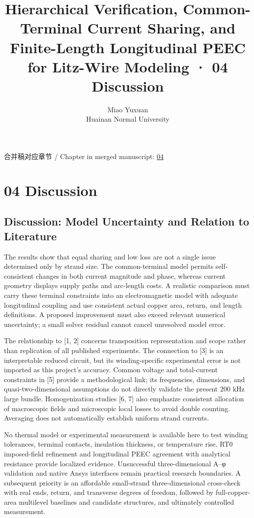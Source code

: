 \documentclass[11pt]{article}
\begin{document}
\title{Hierarchical Verification, Common-Terminal Current Sharing, and Finite-Length Longitudinal PEEC for Litz-Wire Modeling · 04 Discussion}
\author{Miao Yuxuan\\Huainan Normal University}
\date{}
\maketitle
\noindent 合并稿对应章节 / Chapter in merged manuscript: \href{paper_en_single.pdf#chapter-04}{04}\par
\FloatBarrier
\section*{04 Discussion}
\hypertarget{chapter-04}{}
\subsection*{Discussion: Model Uncertainty and Relation to Literature}
\hypertarget{04.discussion.heading}{}
The results show that equal sharing and low loss are not a single issue determined only by strand size. The common-terminal model permits self-consistent changes in both current magnitude and phase, whereas current geometry displays supply paths and arc-length costs. A realistic comparison must carry these terminal constraints into an electromagnetic model with adequate longitudinal coupling and use consistent actual copper area, return, and length definitions. A proposed improvement must also exceed relevant numerical uncertainty; a small solver residual cannot cancel unresolved model error.


The relationship to [1, 2] concerns transposition representation and scope rather than replication of all published experiments. The connection to [3] is an interpretable reduced circuit, but its winding-specific experimental error is not imported as this project’s accuracy. Common voltage and total-current constraints in [5] provide a methodological link; its frequencies, dimensions, and quasi-two-dimensional assumptions do not directly validate the present 200 kHz large bundle. Homogenization studies [6, 7] also emphasize consistent allocation of macroscopic fields and microscopic local losses to avoid double counting. Averaging does not automatically establish uniform strand currents.


No thermal model or experimental measurement is available here to test winding tolerances, terminal contacts, insulation thickness, or temperature rise. RT0 imposed-field refinement and longitudinal PEEC agreement with analytical resistance provide localized evidence. Unsuccessful three-dimensional A–φ validation and native Ansys interfaces remain practical research boundaries. A subsequent priority is an affordable small-strand three-dimensional cross-check with real ends, return, and transverse degrees of freedom, followed by full-copper-area multilevel baselines and candidate structures, and ultimately controlled measurement.
\end{document}

